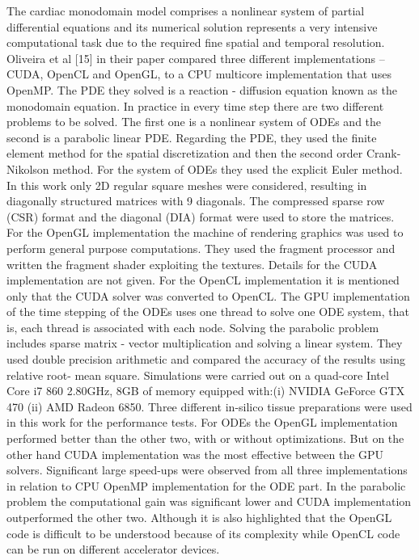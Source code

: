 The cardiac monodomain model comprises a nonlinear system of partial differential equations and its numerical solution represents a very intensive computational task due to the required fine spatial and temporal resolution. Oliveira et al [15] in their paper compared three different implementations – CUDA, OpenCL and OpenGL, to a CPU multicore implementation that uses OpenMP. The PDE they solved is a reaction - diffusion equation known as the monodomain equation. In practice in every time step there are two different problems to be solved. The first one is a nonlinear system of ODEs and the second is a parabolic linear PDE. Regarding the PDE, they used the finite element method for the spatial discretization and then the second order Crank-Nikolson method. For the system of ODEs they used the explicit Euler method. In this work only 2D regular square meshes were considered, resulting in diagonally structured matrices with 9 diagonals. The compressed sparse row (CSR) format and the diagonal (DIA) format were used to store the matrices. For the OpenGL implementation the machine of rendering graphics was used to perform general purpose computations. They used the fragment processor and written the fragment shader exploiting the textures. Details for the CUDA implementation are not given. For the OpenCL implementation it is mentioned only that the CUDA solver was converted to OpenCL. The GPU implementation of the time stepping of the ODEs uses one thread to solve one ODE system, that is, each thread is associated with each node. Solving the parabolic problem includes sparse matrix - vector multiplication and solving a linear system. They used double precision arithmetic and compared the accuracy of the results using relative root- mean square. Simulations were carried out on a quad-core Intel Core i7 860 2.80GHz, 8GB of memory equipped with:(i) NVIDIA GeForce GTX 470 (ii) AMD Radeon 6850. Three different in-silico tissue preparations were used in this work for the performance tests. For ODEs the OpenGL implementation performed better than the other two, with or without optimizations. But on the other hand CUDA implementation was the most effective between the GPU solvers. Significant large speed-ups were observed from all three implementations in relation to CPU OpenMP implementation for the ODE part. In the parabolic problem the computational gain was significant lower and CUDA implementation outperformed the other two. Although it is also highlighted that the OpenGL code is difficult to be understood because of its complexity while OpenCL code can be run on different accelerator devices.

